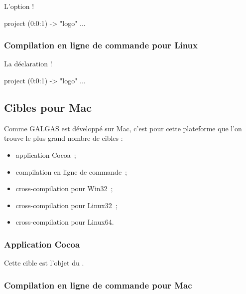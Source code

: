 L'option \ggsq!%
\begin{galgas4}
project (0:0:1) -> "logo" {
  ...
}
\end{galgas4}

\subsubsection{Compilation en ligne de commande pour Linux}

La déclaration \ggsq!%
\begin{galgas4}
project (0:0:1) -> "logo" {
  ...
}
\end{galgas4}



\subsection{Cibles pour Mac}

Comme GALGAS est développé sur Mac, c'est pour cette plateforme que l'on trouve le plus grand nombre de cibles :
\begin{itemize}
  \item application Cocoa~;
  \item compilation en ligne de commande~;
  \item cross-compilation pour Win32~;
  \item cross-compilation pour Linux32~;
  \item cross-compilation pour Linux64.
\end{itemize}

\subsubsection{Application Cocoa}

Cette cible est l'objet du .

\subsubsection{Compilation en ligne de commande pour Mac}

